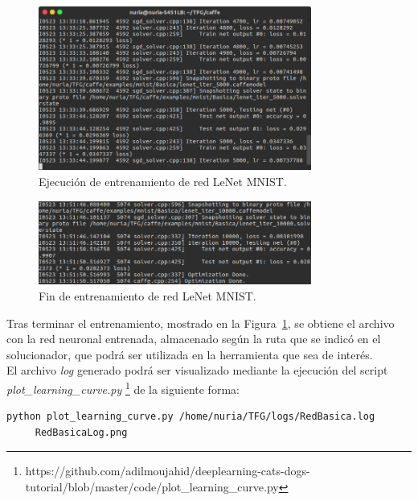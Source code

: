 	\begin{figure}[H]
		\begin{center}
			\includegraphics[width=0.8\textwidth]{figures/RedBasica5000}
			\caption{Ejecución de entrenamiento de red LeNet MNIST.}
		\end{center}
	\end{figure}
	
	\begin{figure}[H]
		\begin{center}
			\includegraphics[width=0.8\textwidth]{figures/RedBasicaFin}
			\caption{Fin de entrenamiento de red LeNet MNIST.}
			\label{fig.finEntrBas}
		\end{center}
	\end{figure}
	
	Tras terminar el entrenamiento, mostrado en la Figura~\ref{fig.finEntrBas}, se obtiene el archivo con la red neuronal entrenada, almacenado según la ruta que se indicó en el solucionador, que podrá ser utilizada en la herramienta que sea de interés.\\

	El archivo \textit{log} generado podrá ser visualizado mediante la ejecución del script \textit{plot\_learning\_curve.py} \footnote{https://github.com/adilmoujahid/deeplearning-cats-dogs-tutorial/blob/master/code/plot\_learning\_curve.py} de la siguiente forma:
	\vspace{10pt}
	\begin{lstlisting}[frame=single]
	python plot_learning_curve.py /home/nuria/TFG/logs/RedBasica.log 
	 RedBasicaLog.png
	\end{lstlisting}
	
